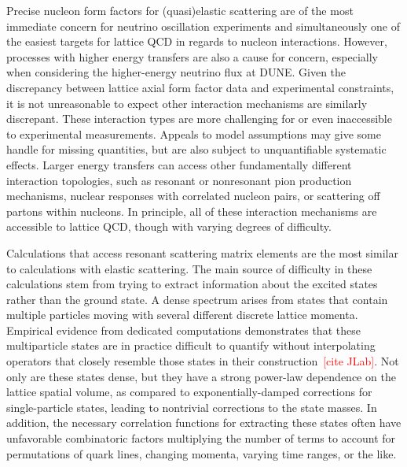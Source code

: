 
Precise nucleon form factors for (quasi)elastic scattering are of the most immediate concern
 for neutrino oscillation experiments and simultaneously one of the easiest
 targets for lattice QCD in regards to nucleon interactions.
However, processes with higher energy transfers are also a cause for concern,
 especially when considering the higher-energy neutrino flux at DUNE.
Given the discrepancy between lattice axial form factor data and experimental constraints,
 it is not unreasonable to expect other interaction mechanisms are similarly discrepant.
These interaction types are more challenging for or even inaccessible to
 experimental measurements.
Appeals to model assumptions may give some handle for missing quantities,
 but are also subject to unquantifiable systematic effects.
Larger energy transfers can access other fundamentally different interaction topologies,
 such as resonant or nonresonant pion production mechanisms,
 nuclear responses with correlated nucleon pairs,
 or scattering off partons within nucleons.
In principle, all of these interaction mechanisms are accessible to lattice QCD,
 though with varying degrees of difficulty.

Calculations that access resonant scattering matrix elements are the most similar
 to calculations with elastic scattering.
The main source of difficulty in these calculations stem from trying to extract
 information about the excited states rather than the ground state.
A dense spectrum arises from states that contain multiple particles
 moving with several different discrete lattice momenta.
Empirical evidence from dedicated computations demonstrates that these multiparticle states are
 in practice difficult to quantify without interpolating operators that closely
 resemble those states in their construction~\textcolor{red}{[cite JLab]}.
Not only are these states dense, but they have a strong power-law dependence on the
 lattice spatial volume, as compared to exponentially-damped corrections
 for single-particle states, leading to nontrivial corrections to the state masses.
In addition, the necessary correlation functions for extracting these states often have
 unfavorable combinatoric factors multiplying the number of terms to account for
 permutations of quark lines, changing momenta, varying time ranges, or the like.

